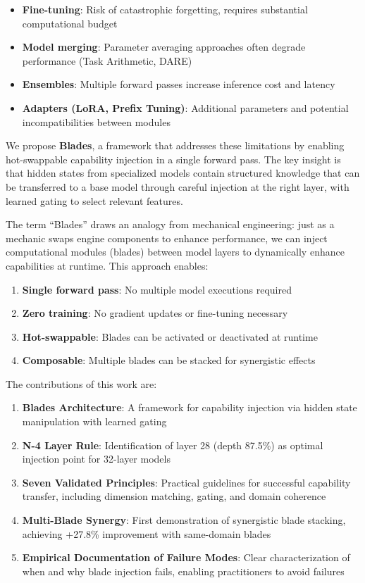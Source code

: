 \documentclass[11pt,a4paper]{article}
\begin{document}
\begin{itemize}
    \item \textbf{Fine-tuning}: Risk of catastrophic forgetting, requires substantial computational budget
    \item \textbf{Model merging}: Parameter averaging approaches often degrade performance (Task Arithmetic, DARE)
    \item \textbf{Ensembles}: Multiple forward passes increase inference cost and latency
    \item \textbf{Adapters (LoRA, Prefix Tuning)}: Additional parameters and potential incompatibilities between modules
\end{itemize}

We propose \textbf{Blades}, a framework that addresses these limitations by enabling hot-swappable capability injection in a single forward pass. The key insight is that hidden states from specialized models contain structured knowledge that can be transferred to a base model through careful injection at the right layer, with learned gating to select relevant features.

The term ``Blades'' draws an analogy from mechanical engineering: just as a mechanic swaps engine components to enhance performance, we can inject computational modules (blades) between model layers to dynamically enhance capabilities at runtime. This approach enables:

\begin{enumerate}
    \item \textbf{Single forward pass}: No multiple model executions required
    \item \textbf{Zero training}: No gradient updates or fine-tuning necessary
    \item \textbf{Hot-swappable}: Blades can be activated or deactivated at runtime
    \item \textbf{Composable}: Multiple blades can be stacked for synergistic effects
\end{enumerate}

The contributions of this work are:

\begin{enumerate}
    \item \textbf{Blades Architecture}: A framework for capability injection via hidden state manipulation with learned gating
    \item \textbf{N-4 Layer Rule}: Identification of layer 28 (depth 87.5\%) as optimal injection point for 32-layer models
    \item \textbf{Seven Validated Principles}: Practical guidelines for successful capability transfer, including dimension matching, gating, and domain coherence
    \item \textbf{Multi-Blade Synergy}: First demonstration of synergistic blade stacking, achieving +27.8\% improvement with same-domain blades
    \item \textbf{Empirical Documentation of Failure Modes}: Clear characterization of when and why blade injection fails, enabling practitioners to avoid failures
\end{enumerate}
\end{document}
